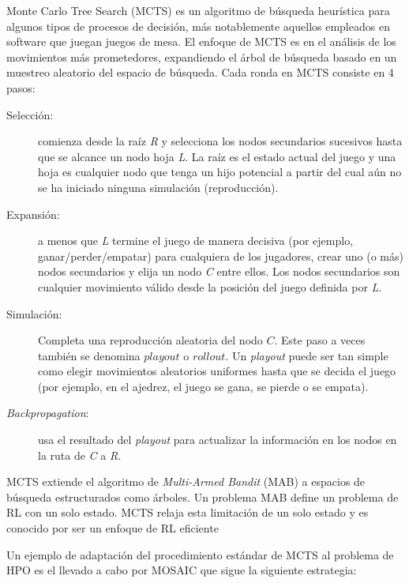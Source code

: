 Monte Carlo Tree Search (MCTS) es un algoritmo de búsqueda heurística para algunos tipos de procesos de decisión, más notablemente aquellos empleados en software que juegan juegos de mesa. El enfoque de MCTS es en el análisis de los movimientos más prometedores, expandiendo el árbol de búsqueda basado en un muestreo aleatorio del espacio de búsqueda. Cada ronda en MCTS consiste en 4 pasos:
\begin{description}
	\item[Selección:] comienza desde la raíz \textit{R} y selecciona los nodos secundarios sucesivos hasta que se alcance un nodo hoja \textit{L}. La raíz es el estado actual del juego y una hoja es cualquier nodo que tenga un hijo potencial a partir del cual aún no se ha iniciado ninguna simulación (reproducción). %
	\item[Expansión:] a menos que \textit{L} termine el juego de manera decisiva (por ejemplo, ganar/perder/empatar) para cualquiera de los jugadores, crear uno (o más) nodos secundarios y elija un nodo \textit{C} entre ellos. Los nodos secundarios son cualquier movimiento válido desde la posición del juego definida por \textit{L}.
	\item[Simulación:] Completa una reproducción aleatoria del nodo $C$. Este paso a veces también se denomina $playout$ o $rollout$. Un \textit{playout} puede ser tan simple como elegir movimientos aleatorios uniformes hasta que se decida el juego (por ejemplo, en el ajedrez, el juego se gana, se pierde o se empata).
	\item[\textit{Backpropagation}:] usa el resultado del \textit{playout} para actualizar la información en los nodos en la ruta de \textit{C} a \textit{R}. 
\end{description}

MCTS extiende el algoritmo de \textit{Multi-Armed Bandit} (MAB) a espacios de búsqueda estructurados como árboles. Un problema MAB define un problema de RL con un solo estado. MCTS relaja esta limitación de un solo estado y es conocido por ser un enfoque de RL eficiente \cite{rakotoarison2019automated}

Un ejemplo de adaptación del procedimiento estándar de MCTS al problema de HPO es el llevado a cabo por MOSAIC \cite{rakotoarison2019automated} que sigue la siguiente estrategia:

